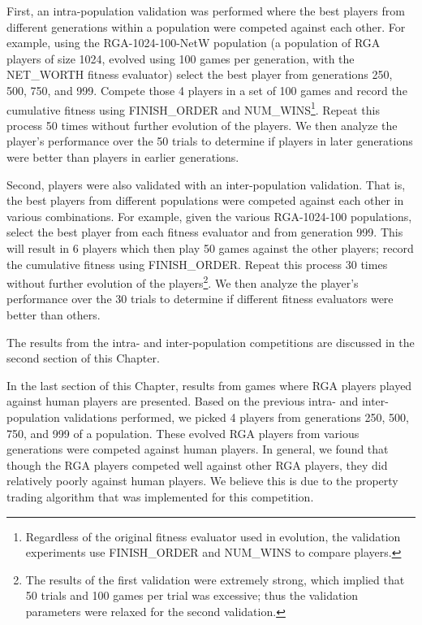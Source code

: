 First, an intra-population validation was performed where the best players from
different generations within a population were competed against each other.
For example, using the RGA-1024-100-NetW population (a population of RGA players
of size 1024, evolved using 100 games per generation, with the NET\_WORTH
fitness evaluator) select the best player from generations 250, 500, 750, and
999. Compete those 4 players in a set of 100 games and record the cumulative
fitness using FINISH\_ORDER and NUM\_WINS\footnote{Regardless of the original
fitness evaluator used in evolution, the validation experiments use
FINISH\_ORDER and NUM\_WINS to compare players.}. Repeat this process 50 times
without further evolution of the players. We then analyze the player's
performance over the 50 trials to determine if players in later generations were
better than players in earlier generations.

Second, players were also validated with an inter-population validation. That
is, the best players from different populations were competed against each other
in various combinations. For example, given the various RGA-1024-100
populations, select the best player from each fitness evaluator and from
generation 999. This will result in 6 players which then play 50 games against
the other players; record the cumulative fitness using FINISH\_ORDER. Repeat
this process 30 times without further evolution of the players\footnote{The
results of the first validation were extremely strong, which implied that 50
trials and 100 games per trial was excessive; thus the validation parameters
were relaxed for the second validation.}. We then analyze the player's
performance over the 30 trials to determine if different fitness evaluators were
better than others.

The results from the intra- and inter-population competitions are discussed in
the second section of this Chapter.

In the last section of this Chapter, results from games where RGA players played
against human players are presented. Based on the previous intra- and
inter-population validations performed, we picked 4 players from generations
250, 500, 750, and 999 of a population. These evolved RGA players from
various generations were competed against human players. In general, we found
that though the RGA players competed well against other RGA players, they did
relatively poorly against human players. We believe this is due to the property
trading algorithm that was implemented for this competition.


